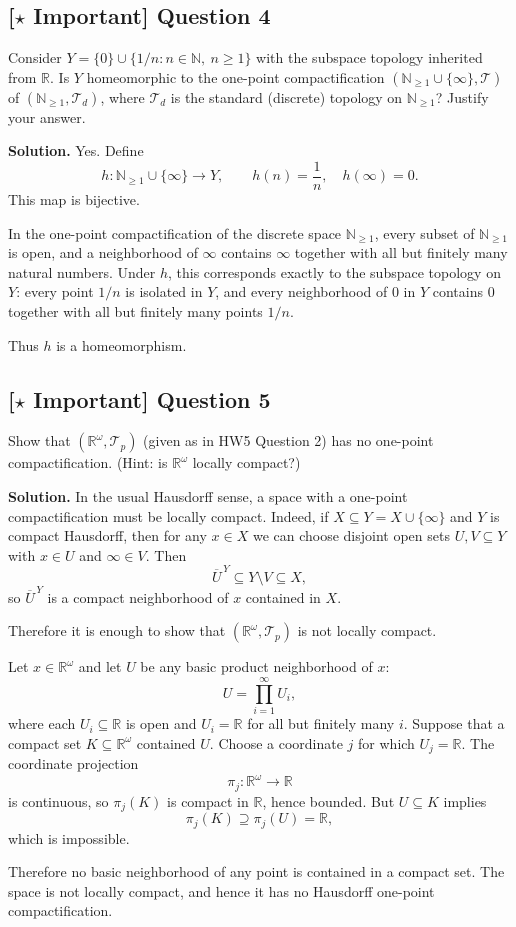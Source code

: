 \documentclass{article}
\newcommand{\R}{\mathbb{R}}
\newcommand{\N}{\mathbb{N}}
\newcommand{\important}{\texorpdfstring{\textbf{[\(\star\) Important]}}{[Important]}}
\newenvironment{solution}{\par\noindent\textbf{Solution.}\quad}{\par}
\begin{document}
\subsection{\important{} Question 4}
Consider $Y = \{0\} \cup \{1/n : n \in \N,\ n \ge 1\}$ with the subspace topology inherited from $\R$. Is $Y$ homeomorphic to the one-point compactification $(\N_{\ge 1} \cup \{\infty\}, \mathcal{T})$ of $(\N_{\ge 1}, \mathcal{T}_d)$, where $\mathcal{T}_d$ is the standard (discrete) topology on $\N_{\ge 1}$? Justify your answer.

\begin{solution}
Yes. Define
\[
  h:\N_{\ge1}\cup\{\infty\}\to Y,\qquad
  h(n)=\frac1n,\quad h(\infty)=0.
\]
This map is bijective.

In the one-point compactification of the discrete space $\N_{\ge1}$, every
subset of $\N_{\ge1}$ is open, and a neighborhood of $\infty$ contains
$\infty$ together with all but finitely many natural numbers. Under $h$,
this corresponds exactly to the subspace topology on $Y$: every point
$1/n$ is isolated in $Y$, and every neighborhood of $0$ in $Y$ contains
$0$ together with all but finitely many points $1/n$.

Thus $h$ is a homeomorphism.
\end{solution}

\subsection{\important{} Question 5}
Show that $(\R^\omega, \mathcal{T}_p)$ (given as in HW5 Question 2) has no one-point compactification. (Hint: is $\R^\omega$ locally compact?)

\begin{solution}
In the usual Hausdorff sense, a space with a one-point compactification
must be locally compact. Indeed, if $X\subseteq Y=X\cup\{\infty\}$ and
$Y$ is compact Hausdorff, then for any $x\in X$ we can choose disjoint
open sets $U,V\subseteq Y$ with $x\in U$ and $\infty\in V$. Then
\[
  \overline U^{\,Y}\subseteq Y\setminus V\subseteq X,
\]
so $\overline U^{\,Y}$ is a compact neighborhood of $x$ contained in $X$.

Therefore it is enough to show that $(\R^\omega,\mathcal T_p)$ is not
locally compact.

Let $x\in\R^\omega$ and let $U$ be any basic product neighborhood of $x$:
\[
  U=\prod_{i=1}^{\infty}U_i,
\]
where each $U_i\subseteq\R$ is open and $U_i=\R$ for all but finitely many
$i$. Suppose that a compact set $K\subseteq\R^\omega$ contained $U$.
Choose a coordinate $j$ for which $U_j=\R$. The coordinate projection
\[
  \pi_j:\R^\omega\to\R
\]
is continuous, so $\pi_j(K)$ is compact in $\R$, hence bounded. But
$U\subseteq K$ implies
\[
  \pi_j(K)\supseteq\pi_j(U)=\R,
\]
which is impossible.

Therefore no basic neighborhood of any point is contained in a compact
set. The space is not locally compact, and hence it has no Hausdorff
one-point compactification.
\end{solution}
\end{document}
